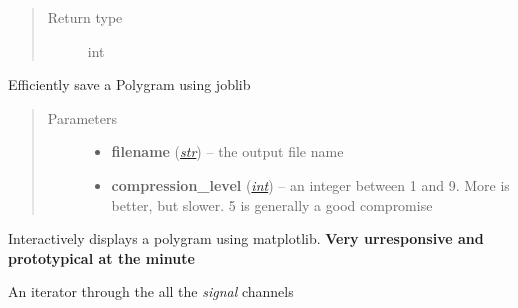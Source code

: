 \documentclass[letterpaper,10pt,english]{sphinxmanual}
\begin{document}
\begin{fulllineitems}
\begin{fulllineitems}
\begin{quote}
\begin{description}
\item[{Return type}] \leavevmode
int

\end{description}\end{quote}

\end{fulllineitems}


\begin{fulllineitems}
\label{pyrem.polygram:pyrem.polygram.Polygram.save}
Efficiently save a Polygram using joblib
\begin{quote}\begin{description}
\item[{Parameters}] \leavevmode\begin{itemize}
\item {} 
\textbf{filename} (\href{http://docs.python.org/2.7/library/functions.html\#str}{\emph{str}}) -- the output file name

\item {} 
\textbf{compression\_level} (\href{http://docs.python.org/2.7/library/functions.html\#int}{\emph{int}}) -- an integer between 1 and 9. More is better, but slower. 5 is generally a good compromise

\end{itemize}

\end{description}\end{quote}

\end{fulllineitems}


\begin{fulllineitems}
\label{pyrem.polygram:pyrem.polygram.Polygram.show}
Interactively displays a polygram using matplotlib. \textbf{Very urresponsive and prototypical at the minute}

\end{fulllineitems}


\begin{fulllineitems}
\label{pyrem.polygram:pyrem.polygram.Polygram.signal_channels}
An iterator through the all the \emph{signal} channels

\end{fulllineitems}


\end{fulllineitems}
\end{document}
